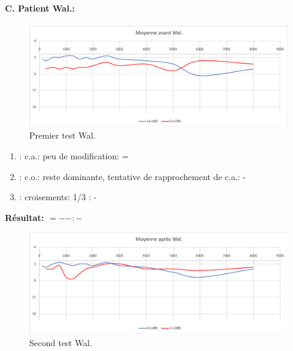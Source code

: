 \paragraph{C. Patient Wal.:}



\begin{figure}[th]
\centering
\includegraphics[width=1\linewidth]{images/graphiques/wal_pre.png}
\caption[Patient C. :1° test]{Premier test Wal.}

\end{figure}

	\begin{enumerate}

 		\item : c.a.: peu de modification: =

 		\item : c.o.: reste dominante, tentative de rapprochement de c.a.: -
 		\item : croisements: 1/3 :  -

                \end{enumerate}

                \textbf{ Résultat:  $= -  -        : -$ }

               \begin{figure}[th]
\centering
\includegraphics[width=1\linewidth]{images/graphiques/wal_post.png}
\caption[Patient C. : 2° test]{Second test Wal.}

\label{groupecontroleimage1}
\end{figure}






